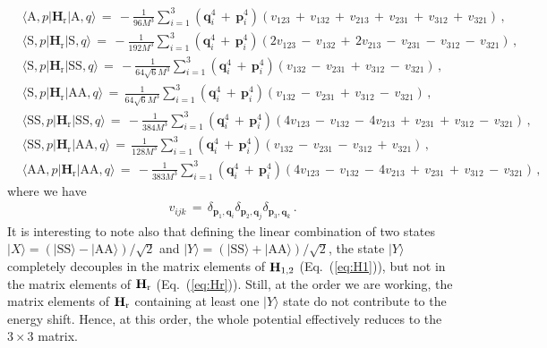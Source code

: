 \documentclass[12pt,prd,tightenlines,nofootinbib]{revtex4-2}
\begin{document}
\begin{align}\label{eq:Hr}
    &\langle\text{A},p| \textbf{H}_{\text{r}} | \text{A},q \rangle\, =\, -\frac{1}{96M^{3}}\sum_{i = 1}^{3}(\textbf{q}_{i}^{4}\, +\, \textbf{p}_{i}^{4})(v_{123}\, +\, v_{132}\, +\, v_{213}\, +\, v_{231}\,+\, v_{312}\, +\, v_{321})\,,\nonumber\\[2mm]
    &\langle\text{S},p| \textbf{H}_{\text{r}} | \text{S},q \rangle\, =\, -\frac{1}{192M^{3}}\sum_{i = 1}^{3}(\textbf{q}_{i}^{4}\, +\, \textbf{p}_{i}^{4})(2v_{123}\, -\, v_{132}\, +\, 2v_{213}\, -\, v_{231}\,-\, v_{312}\, -\, v_{321})\,,\nonumber\\[2mm]
    &\langle\text{S},p| \textbf{H}_{\text{r}} | \text{SS},q \rangle\, =\, -\frac{1}{64\sqrt{6}M^{3}}\sum_{i = 1}^{3}(\textbf{q}_{i}^{4}\, +\, \textbf{p}_{i}^{4})(v_{132}\, -\, v_{231}\,+\, v_{312}\, -\, v_{321})\,,\nonumber\\[2mm]
    &\langle\text{S},p| \textbf{H}_{\text{r}} | \text{AA},q \rangle\, =\, \frac{1}{64\sqrt{6}M^{3}}\sum_{i = 1}^{3}(\textbf{q}_{i}^{4}\, +\, \textbf{p}_{i}^{4})(v_{132}\, -\, v_{231}\,+\, v_{312}\, -\, v_{321})\,,\nonumber\\[2mm]
    &\langle\text{SS},p| \textbf{H}_{\text{r}} | \text{SS},q \rangle\, =\, -\frac{1}{384M^{3}}\sum_{i = 1}^{3}(\textbf{q}_{i}^{4}\, +\, \textbf{p}_{i}^{4})(4v_{123}\, -\,v_{132}\,-\, 4v_{213}\,+\,v_{231}\,+\, v_{312}\, -\, v_{321})\,,\nonumber\\[2mm]
    &\langle\text{SS},p| \textbf{H}_{\text{r}} | \text{AA},q \rangle\, =\, \frac{1}{128M^{3}}\sum_{i = 1}^{3}(\textbf{q}_{i}^{4}\, +\, \textbf{p}_{i}^{4})(v_{132}\,-\, v_{231}\,-\, v_{312}\, +\, v_{321})\,,\nonumber\\[2mm]
    &\langle\text{AA},p| \textbf{H}_{\text{r}} | \text{AA},q \rangle\, =\, -\frac{1}{383M^{3}}\sum_{i = 1}^{3}(\textbf{q}_{i}^{4}\, +\, \textbf{p}_{i}^{4})(4v_{123}\, -\,v_{132}\,-\, 4v_{213}\,+\,v_{231}\,+\, v_{312}\, -\, v_{321})\,,
\end{align}
where we have
\begin{align}
  v_{ijk}\,=\, \delta_{\textbf{p}_{1},\textbf{q}_{i}}\delta_{\textbf{p}_{2},\textbf{q}_{j}}\delta_{\textbf{p}_{3},\textbf{q}_{k}}\,.
  \end{align}
It is interesting to note also that defining the linear combination
  of two states $|X\rangle=(|\text{SS}\rangle-|\text{AA}\rangle)/\sqrt{2}$ and
  $|Y\rangle=(|\text{SS}\rangle+|\text{AA}\rangle)/\sqrt{2}$, the state $|Y\rangle$ completely
  decouples in the matrix elements of ${\bf H}_{1,2}$ (Eq.~(\ref{eq:H1})), but not
  in the matrix elements of ${\bf H}_{\text{r}}$ (Eq.~(\ref{eq:Hr})). Still, at the order we are working,
  the matrix elements of ${\bf H}_{\text{r}}$ containing at least one $|Y\rangle$ state
  do not contribute to the energy shift. Hence, at this order, the whole potential
  effectively reduces to the $3\times 3$ matrix.
\end{document}
